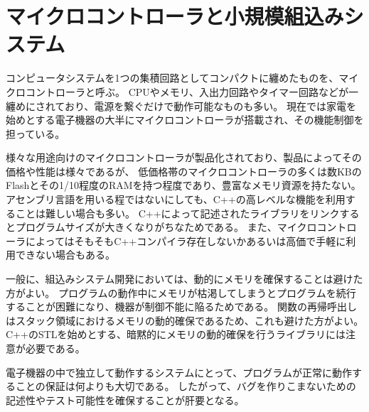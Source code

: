 \section{マイクロコントローラと小規模組込みシステム}
コンピュータシステムを1つの集積回路としてコンパクトに纏めたものを、マイクロコントローラと呼ぶ。
CPUやメモリ、入出力回路やタイマー回路などが一纏めにされており、電源を繋ぐだけで動作可能なものも多い。
現在では家電を始めとする電子機器の大半にマイクロコントローラが搭載され、その機能制御を担っている。

様々な用途向けのマイクロコントローラが製品化されており、製品によってその価格や性能は様々であるが、
低価格帯のマイクロコントローラの多くは数KBのFlashとその1/10程度のRAMを持つ程度であり、豊富なメモリ資源を持たない。
アセンブリ言語を用いる程ではないにしても、C++の高レベルな機能を利用することは難しい場合も多い。
C++によって記述されたライブラリをリンクするとプログラムサイズが大きくなりがちなためである。
また、マイクロコントローラによってはそもそもC++コンパイラ存在しないかあるいは高価で手軽に利用できない場合もある。

一般に、組込みシステム開発においては、動的にメモリを確保することは避けた方がよい。
プログラムの動作中にメモリが枯渇してしまうとプログラムを続行することが困難になり、機器が制御不能に陥るためである。
関数の再帰呼出しはスタック領域におけるメモリの動的確保であるため、これも避けた方がよい。
C++のSTLを始めとする、暗黙的にメモリの動的確保を行うライブラリには注意が必要である。

電子機器の中で独立して動作するシステムにとって、プログラムが正常に動作することの保証は何よりも大切である。
したがって、バグを作りこまないための記述性やテスト可能性を確保することが肝要となる。

